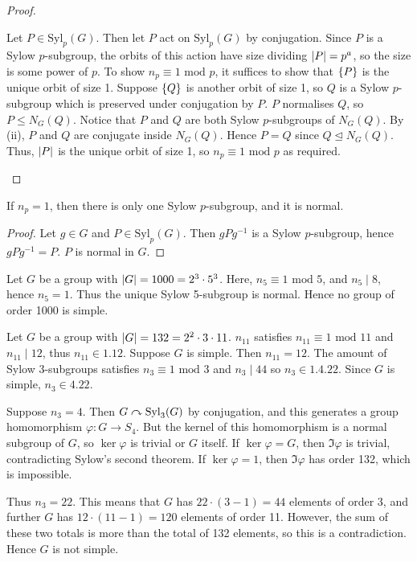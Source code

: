 \begin{proof}
\begin{enumerate}
		      Let \( P \in \mathrm{Syl}_p(G) \).
		      Then let \( P \) act on \( \mathrm{Syl}_p(G) \) by conjugation.
		      Since \( P \) is a Sylow \( p \)-subgroup, the orbits of this action have size dividing \( \abs{P} = p^a \), so the size is some power of \( p \).
		      To show \( n_p \equiv 1 \text{ mod } p \), it suffices to show that \( \qty{P} \) is the unique orbit of size 1.
		      Suppose \( \qty{Q} \) is another orbit of size 1, so \( Q \) is a Sylow \( p \)-subgroup which is preserved under conjugation by \( P \).
		      \( P \) normalises \( Q \), so \( P \leq N_G(Q) \).
		      Notice that \( P \) and \( Q \) are both Sylow \( p \)-subgroups of \( N_G(Q) \).
		      By (ii), \( P \) and \( Q \) are conjugate inside \( N_G(Q) \).
		      Hence \( P = Q \) since \( Q \trianglelefteq N_G(Q) \).
		      Thus, \( \abs{P} \) is the unique orbit of size 1, so \( n_p \equiv 1 \text{ mod } p \) as required.
	\end{enumerate}
\end{proof}
\begin{corollary}
	If \( n_p = 1 \), then there is only one Sylow \( p \)-subgroup, and it is normal.
\end{corollary}
\begin{proof}
	Let \( g \in G \) and \( P \in \mathrm{Syl}_p(G) \).
	Then \( g P g^{-1} \) is a Sylow \( p \)-subgroup, hence \( g P g^{-1} = P \).
	\( P \) is normal in \( G \).
\end{proof}
\begin{example}
	Let \( G \) be a group with \( \abs{G} = 1000 = 2^3 \cdot 5^3 \).
	Here, \( n_5 \equiv 1 \text{ mod } 5 \), and \( n_5 \mid 8 \), hence \( n_5 = 1 \).
	Thus the unique Sylow 5-subgroup is normal.
	Hence no group of order 1000 is simple.
\end{example}
\begin{example}
	Let \( G \) be a group with \( \abs{G} = 132 = 2^2 \cdot 3 \cdot 11 \).
	\( n_{11} \) satisfies \( n_{11} \equiv 1 \text{ mod } 11 \) and \( n_{11} \mid 12 \), thus \( n_{11} \in \qty{1, 12} \).
	Suppose \( G \) is simple.
	Then \( n_{11} = 12 \).
	The amount of Sylow 3-subgroups satisfies \( n_3 \equiv 1 \text{ mod } 3 \) and \( n_3 \mid 44 \) so \( n_3 \in \qty{1, 4, 22} \).
	Since \( G \) is simple, \( n_3 \in \qty{4, 22} \).

	Suppose \( n_3 = 4 \).
	Then \( G \curvearrowright \mathrm{Syl}_3(G) \) by conjugation, and this generates a group homomorphism \( \varphi \colon G \to S_4 \).
	But the kernel of this homomorphism is a normal subgroup of \( G \), so \( \ker \varphi \) is trivial or \( G \) itself.
	If \( \ker \varphi = G \), then \( \Im \varphi \) is trivial, contradicting Sylow's second theorem.
	If \( \ker \varphi = 1 \), then \( \Im \varphi \) has order 132, which is impossible.

	Thus \( n_3 = 22 \).
	This means that \( G \) has \( 22 \cdot (3-1) = 44 \) elements of order 3, and further \( G \) has \( 12 \cdot (11 - 1) = 120 \) elements of order 11.
	However, the sum of these two totals is more than the total of 132 elements, so this is a contradiction.
	Hence \( G \) is not simple.
\end{example}
